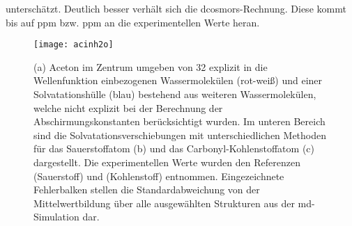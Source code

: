 unterschätzt. Deutlich besser verhält sich die \ac{dcosmors}-Rechnung. Diese kommt bis auf \unit[9]{ppm} bzw. \unit[3]{ppm} an die experimentellen Werte heran. 
	\begin{figure}[ht!]
	\centering
	\texttt{[image: acinh2o]}
	\captionsetup{figurewithin = chapter}
	\captionsetup{font=small, labelfont=bf}\caption[Solvatationseffekte für Aceton in Wasser]{\textsf{(a)} Aceton im Zentrum umgeben von 32 explizit in die Wellenfunktion einbezogenen Wassermolekülen (rot-weiß) und einer Solvatationshülle (blau) bestehend aus weiteren Wassermolekülen, welche nicht explizit bei der Berechnung der Abschirmungskonstanten berücksichtigt wurden. Im unteren Bereich sind die Solvatationsverschiebungen mit unterschiedlichen Methoden für das Sauerstoffatom \textsf{(b)} und das Carbonyl-Kohlenstoffatom \textsf{(c)} dargestellt. Die experimentellen Werte wurden den Referenzen \cite{cossi2003different} (Sauerstoff) und \cite{tiffon1978effet} (Kohlenstoff) entnommen. Eingezeichnete Fehlerbalken stellen die Standardabweichung von der Mittelwertbildung über alle ausgewählten Strukturen aus der \ac{md}-Simulation dar.}
\label{abb:acinh2o}
\end{figure}
\FloatBarrier
